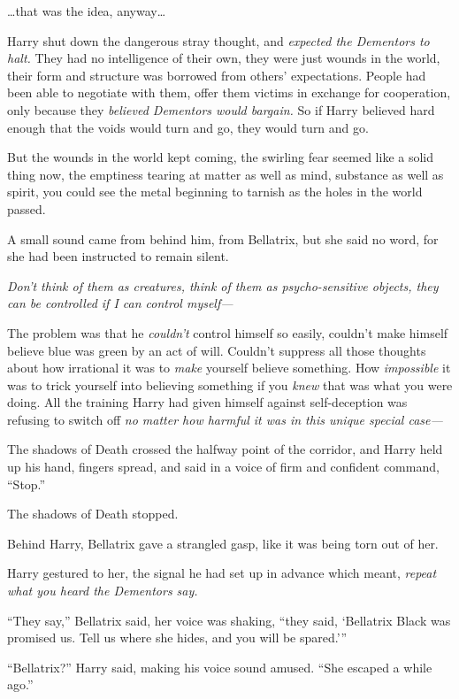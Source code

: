 …that was the idea, anyway…

Harry shut down the dangerous stray thought, and \emph{expected the Dementors to halt.} They had no intelligence of their own, they were just wounds in the world, their form and structure was borrowed from others’ expectations. People had been able to negotiate with them, offer them victims in exchange for cooperation, only because they \emph{believed Dementors would bargain.} So if Harry believed hard enough that the voids would turn and go, they would turn and go.

But the wounds in the world kept coming, the swirling fear seemed like a solid thing now, the emptiness tearing at matter as well as mind, substance as well as spirit, you could see the metal beginning to tarnish as the holes in the world passed.

A small sound came from behind him, from Bellatrix, but she said no word, for she had been instructed to remain silent.

\emph{Don’t think of them as creatures, think of them as psycho-sensitive objects, they can be controlled if I can control myself—}

The problem was that he \emph{couldn’t} control himself so easily, couldn’t make himself believe blue was green by an act of will. Couldn’t suppress all those thoughts about how irrational it was to \emph{make} yourself believe something. How \emph{impossible} it was to trick yourself into believing something if you \emph{knew} that was what you were doing. All the training Harry had given himself against self-deception was refusing to switch off \emph{no matter how harmful it was in this unique special case—}

The shadows of Death crossed the halfway point of the corridor, and Harry held up his hand, fingers spread, and said in a voice of firm and confident command, “Stop.”

The shadows of Death stopped.

Behind Harry, Bellatrix gave a strangled gasp, like it was being torn out of her.

Harry gestured to her, the signal he had set up in advance which meant, \emph{repeat what you heard the Dementors say.}

“They say,” Bellatrix said, her voice was shaking, “they said, ‘Bellatrix Black was promised us. Tell us where she hides, and you will be spared.’”

“Bellatrix?” Harry said, making his voice sound amused. “She escaped a while ago.”


